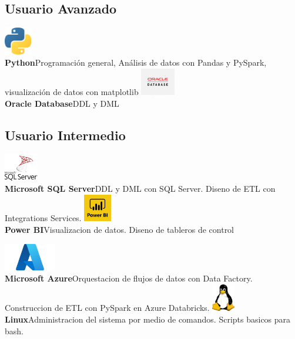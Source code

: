 \documentclass[10pt,letter,sans]{moderncv}
\begin{document}
\subsection{Usuario Avanzado}
 
\cvdoubleitem %
{\includegraphics[height=1.2cm]{img/python01.png} \\ \textbf{Python}}{Programaci\'on general, An\'alisis de datos con Pandas y PySpark, visualizaci\'on de datos con matplotlib}
{\includegraphics[height=1.2cm]{img/oracle01.png} \\ \textbf{Oracle Database}}{DDL y DML}
 
\subsection{Usuario Intermedio}
 \cvdoubleitem %
 {\includegraphics[height=1.2cm]{img/sqlserver01.png} \\ 
 	\textbf{Microsoft SQL Server}}{DDL y DML con SQL Server. Diseno de ETL con Integrations Services.}
 {\includegraphics[height=1.2cm]{img/pbi02.png} \\ 
 	\textbf{Power BI}}{Visualizacion de datos. Diseno de tableros de control}
 
 \cvdoubleitem %
 {\includegraphics[height=1.2cm]{img/azure01.png} \\ 
 	\textbf{Microsoft Azure}}{Orquestacion de flujos de datos con Data Factory. Construccion de ETL con PySpark en Azure Databricks. }
 {\includegraphics[height=1.2cm]{img/linux02.png} \\ 
 	\textbf{Linux}}{Administracion del sistema por medio de comandos. Scripts basicos para bash. }
 
\end{document}
